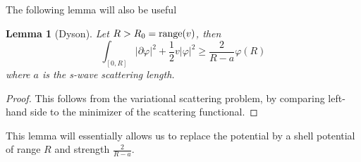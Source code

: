 \documentclass[a4paper,11pt]{article}
\newcommand{\abs}[1]{\left\lvert #1 \right\rvert}
\newtheorem{lemma}{Lemma}
\numberwithin{equation}{section}
\begin{document}
	
	The following lemma will also be useful \begin{lemma}[Dyson] Let $ R>R_0=\textnormal{range}(v) $, then
		\begin{equation}
			\int_{[0,R]} \abs{\partial \varphi}^2+\frac12 v\abs{\varphi}^2\geq \frac{2}{R-a}\varphi(R)
		\end{equation}
		where $ a $ is the s-wave scattering length.
	\end{lemma}
	\begin{proof}
		This follows from the variational scattering problem, by comparing left-hand side to the minimizer of the scattering functional.
	\end{proof}
	This lemma will essentially allows us to replace the potential by a shell potential of range $ R $ and strength $ \frac{2}{R-a} $.
	 
\end{document}
